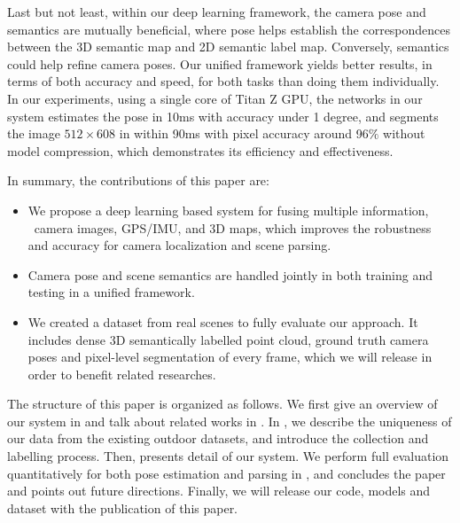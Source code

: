 Last but not least, within our deep learning framework, the camera pose and semantics are mutually beneficial, where pose helps establish the correspondences between the 3D semantic map and 2D semantic label map. Conversely, semantics could help refine camera poses. Our unified framework yields better results, in terms of both accuracy and speed, for both tasks than doing them individually. In our experiments, using a single core of Titan Z GPU, the networks in our system estimates the pose in 10ms with accuracy under 1 degree, and segments the image $512 \times 608$ in within 90ms with pixel accuracy around 96$\%$ without model compression, which demonstrates its efficiency and effectiveness.

In summary, the contributions of this paper are:
\begin{itemize}
\vspace{-0.5\baselineskip}
    \setlength{\itemsep}{-2pt}
    \item We propose a deep learning based system for fusing multiple information, \ie~camera images, GPS/IMU, and 3D maps, which improves the robustness and accuracy for camera localization and scene parsing.
    \item Camera pose and scene semantics are handled jointly in both training and testing in a unified framework.
    \item We created a dataset from real scenes to fully evaluate our approach. It includes dense 3D semantically labelled point cloud, ground truth camera poses and pixel-level segmentation of every frame, which we will release in order to benefit related researches.
\vspace{-0.4\baselineskip}
\end{itemize}

The structure of this paper is organized as follows. We first give an overview of our system in  and talk about related works in . In , we describe the uniqueness of our data from the existing outdoor datasets, and introduce the collection and labelling process. 
Then,  presents detail of our system. We perform full evaluation quantitatively for both pose estimation and parsing in , and  concludes the paper and points out future directions. Finally, we will release our code, models and dataset with the publication of this paper.

